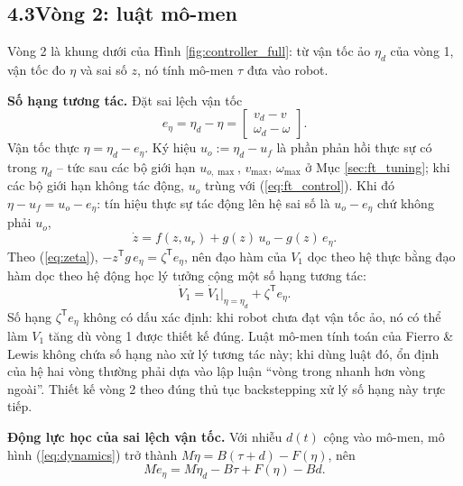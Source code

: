 \documentclass[12pt,a4paper]{article}
\makeatletter
\newcommand{\seclabel}[2]{\phantomsection\protected@edef\@currentlabel{#2}\label{#1}}
\newcommand{\T}{\mathsf{T}}
\makeatother
\begin{document}
\subsection*{4.3\quad Vòng 2: luật mô-men}
\seclabel{sec:step2}{4.3}

Vòng 2 là khung dưới của Hình \ref{fig:controller_full}: từ vận tốc ảo $\eta_d$ của vòng 1, vận tốc đo $\eta$ và sai số $z$, nó tính mô-men $\tau$ đưa vào robot.

\textbf{Số hạng tương tác.} Đặt sai lệch vận tốc
\begin{equation}\label{eq:vel_error}
    e_\eta = \eta_d - \eta = \begin{bmatrix} v_d - v \\ \omega_d - \omega \end{bmatrix} .
\end{equation}
Vận tốc thực $\eta = \eta_d - e_\eta$. Ký hiệu $u_o := \eta_d - u_f$ là phần phản hồi thực sự có trong $\eta_d$ -- tức sau các bộ giới hạn $u_{o,\max}$, $v_{\max}$, $\omega_{\max}$ ở Mục \ref{sec:ft_tuning}; khi các bộ giới hạn không tác động, $u_o$ trùng với (\ref{eq:ft_control}). Khi đó $\eta - u_f = u_o - e_\eta$: tín hiệu thực sự tác động lên hệ sai số là $u_o - e_\eta$ chứ không phải $u_o$,
\begin{equation}\label{eq:cascade_dynamics}
    \dot z = f(z, u_r) + g(z)\,u_o - g(z)\,e_\eta .
\end{equation}
Theo (\ref{eq:zeta}), $-z^\T g\, e_\eta = \zeta^\T e_\eta$, nên đạo hàm của $V_1$ dọc theo hệ thực bằng đạo hàm dọc theo hệ động học lý tưởng cộng một số hạng tương tác:
\begin{equation}\label{eq:V1_interaction}
    \dot V_1 = \dot V_1\big|_{\eta = \eta_d} + \zeta^\T e_\eta .
\end{equation}
Số hạng $\zeta^\T e_\eta$ không có dấu xác định: khi robot chưa đạt vận tốc ảo, nó có thể làm $V_1$ tăng dù vòng 1 được thiết kế đúng. Luật mô-men tính toán của Fierro \& Lewis \cite{Fierro1997} không chứa số hạng nào xử lý tương tác này; khi dùng luật đó, ổn định của hệ hai vòng thường phải dựa vào lập luận ``vòng trong nhanh hơn vòng ngoài''. Thiết kế vòng 2 theo đúng thủ tục backstepping xử lý số hạng này trực tiếp.

\textbf{Động lực học của sai lệch vận tốc.} Với nhiễu $d(t)$ cộng vào mô-men, mô hình (\ref{eq:dynamics}) trở thành $M\dot\eta = B(\tau + d) - F(\eta)$, nên
\begin{equation}\label{eq:e_dyn_open}
    M\dot e_\eta = M\dot\eta_d - B\tau + F(\eta) - B d .
\end{equation}
\end{document}
